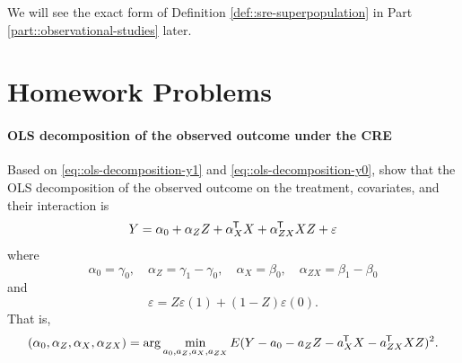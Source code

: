 %  
%  


We will see the exact form of Definition \ref{def::sre-superpopulation} in Part \ref{part::observational-studies} later. 
  

 \section{Homework Problems}
 
\paragraph{OLS decomposition of the observed outcome under the CRE}\label{hw::ols-decompose-cre}

Based on \eqref{eq::ols-decomposition-y1} and \eqref{eq::ols-decomposition-y0}, show that the OLS decomposition of the observed outcome on the treatment, covariates, and their interaction is
$$
Y= \alpha_0 + \alpha_Z  Z +
\alpha_X ^{\mkern-1.5mu\mathsf{T}} X + \alpha_{ZX} ^{\mkern-1.5mu\mathsf{T}} X Z + \varepsilon 
$$
where 
$$
\alpha_0 = \gamma_0 ,\quad
\alpha_Z = \gamma_1 - \gamma_0,\quad
\alpha_X  =  \beta_0, \quad
\alpha_{ZX} = \beta_1 - \beta_0
$$
and
$$
\varepsilon  = Z \varepsilon (1) + (1-Z) \varepsilon (0). 
$$
That is,
$$
(\alpha_0, \alpha_Z, \alpha_X , \alpha_{ZX} )
=\arg\min_{a_0, a_Z, a_X, a_{ZX}   }  E  (  Y - a_0 - a_Z Z - a_X^{\mkern-1.5mu\mathsf{T}} X -a_{ZX} ^{\mkern-1.5mu\mathsf{T}} X Z)^2.
$$ 
 
